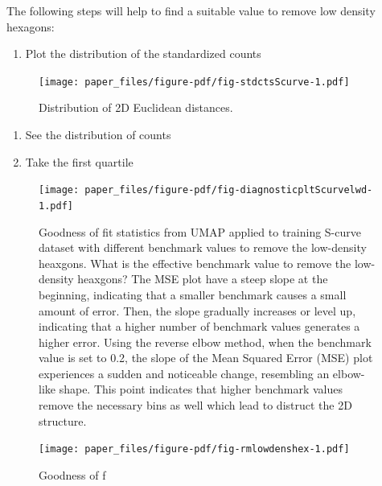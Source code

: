 \documentclass[
  12pt]{article}
\providecommand{\tightlist}{%
  \setlength{\itemsep}{0pt}\setlength{\parskip}{0pt}}\usepackage{longtable,booktabs,array}
\begin{document}
The following steps will help to find a suitable value to remove low
density hexagons:

\begin{enumerate}
\def\labelenumi{\arabic{enumi}.}
\tightlist
\item
  Plot the distribution of the standardized counts
\end{enumerate}

\begin{figure}[H]

{\centering \texttt{[image: paper\_files/figure-pdf/fig-stdctsScurve-1.pdf]}

}

\caption{\label{fig-stdctsScurve}Distribution of 2D Euclidean
distances.}

\end{figure}

\begin{enumerate}
\def\labelenumi{\arabic{enumi}.}
\setcounter{enumi}{1}
\item
  See the distribution of counts
\item
  Take the first quartile
\end{enumerate}

\begin{figure}

{\centering \texttt{[image: paper\_files/figure-pdf/fig-diagnosticpltScurvelwd-1.pdf]}

}

\caption{\label{fig-diagnosticpltScurvelwd}Goodness of fit statistics
from UMAP applied to training S-curve dataset with different benchmark
values to remove the low-density heaxgons. What is the effective
benchmark value to remove the low-density heaxgons? The MSE plot have a
steep slope at the beginning, indicating that a smaller benchmark causes
a small amount of error. Then, the slope gradually increases or level
up, indicating that a higher number of benchmark values generates a
higher error. Using the reverse elbow method, when the benchmark value
is set to 0.2, the slope of the Mean Squared Error (MSE) plot
experiences a sudden and noticeable change, resembling an elbow-like
shape. This point indicates that higher benchmark values remove the
necessary bins as well which lead to distruct the 2D structure.}

\end{figure}

\begin{figure}[H]

{\centering \texttt{[image: paper\_files/figure-pdf/fig-rmlowdenshex-1.pdf]}

}

\caption{\label{fig-rmlowdenshex}Goodness of f}

\end{figure}
\end{document}
